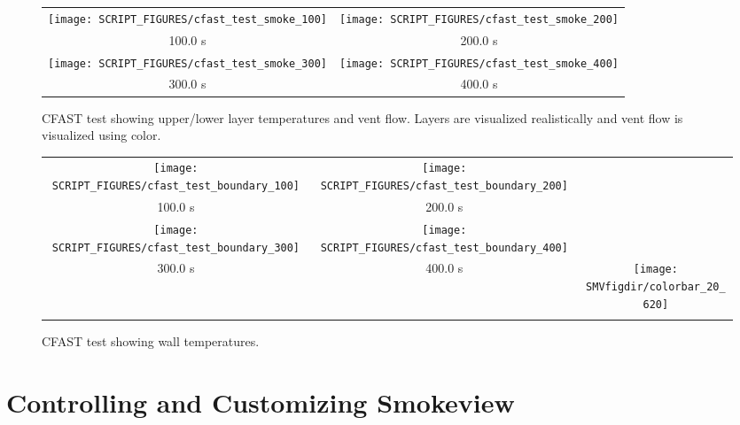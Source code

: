 \documentclass[11pt,twoside]{book}
\begin{document}
\begin{figure}[bph]
\begin{center}
\begin{tabular}{cc}
\texttt{[image: SCRIPT\_FIGURES/cfast\_test\_smoke\_100]}&
\texttt{[image: SCRIPT\_FIGURES/cfast\_test\_smoke\_200]}\\
100.0 s&200.0 s\\
\texttt{[image: SCRIPT\_FIGURES/cfast\_test\_smoke\_300]}&
\texttt{[image: SCRIPT\_FIGURES/cfast\_test\_smoke\_400]}\\
300.0 s&400.0 s\\
\end{tabular}
\end{center}
\caption{CFAST test showing upper/lower layer temperatures and vent flow.
Layers are visualized realistically and vent flow
is visualized using color.}
\label{figcfastsmoke}%
\end{figure}

\begin{figure}[bph]
\begin{center}
\begin{tabular}{ccc}
\texttt{[image: SCRIPT\_FIGURES/cfast\_test\_boundary\_100]}&
\texttt{[image: SCRIPT\_FIGURES/cfast\_test\_boundary\_200]}\\
100.0 s&200.0 s\\
\texttt{[image: SCRIPT\_FIGURES/cfast\_test\_boundary\_300]}&
\texttt{[image: SCRIPT\_FIGURES/cfast\_test\_boundary\_400]}\\
300.0 s&400.0 s
&\raisebox{0.0ex}[0pt]{\texttt{[image: \\SMVfigdir/colorbar\_20\_620]}}\\
\\
\end{tabular}
\end{center}
\caption{CFAST test showing wall temperatures.}
\label{figcfastboundary}%
\end{figure}


\part{Controlling and Customizing Smokeview}
\end{document}

